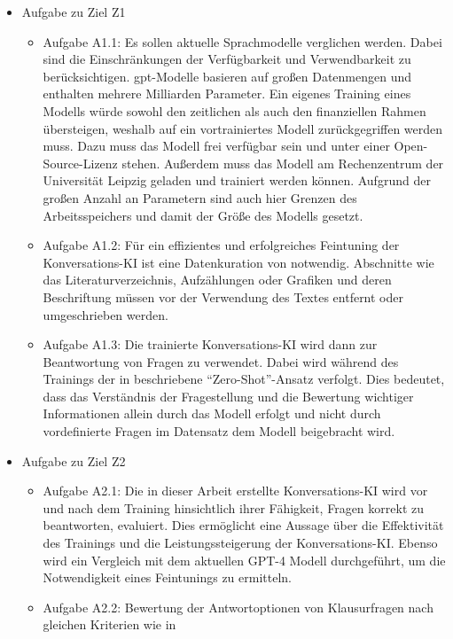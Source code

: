 \begin{itemize}
  \item Aufgabe zu Ziel Z1
  \begin{itemize}
    \item Aufgabe A1.1: Es sollen aktuelle Sprachmodelle verglichen werden. Dabei sind die Einschränkungen der Verfügbarkeit und Verwendbarkeit zu berücksichtigen. 
    \ac{gpt}-Modelle basieren auf großen Datenmengen und enthalten mehrere Milliarden Parameter. 
    Ein eigenes Training eines Modells würde sowohl den zeitlichen als auch den finanziellen Rahmen übersteigen, weshalb auf ein vortrainiertes Modell zurückgegriffen werden muss. 
    Dazu muss das Modell frei verfügbar sein und unter einer Open-Source-Lizenz stehen. Außerdem muss das Modell am Rechenzentrum der Universität Leipzig geladen und trainiert werden können. Aufgrund der großen Anzahl an Parametern sind auch hier Grenzen des Arbeitsspeichers und damit der Größe des Modells gesetzt.
    \item Aufgabe A1.2: Für ein effizientes und erfolgreiches Feintuning der Konversations-KI ist eine Datenkuration von \citet{bb} notwendig. 
    Abschnitte wie das Literaturverzeichnis, Aufzählungen oder Grafiken und deren Beschriftung müssen vor der Verwendung des Textes entfernt oder umgeschrieben werden.
    \item Aufgabe A1.3: Die trainierte Konversations-KI wird dann zur Beantwortung von Fragen zu \citet{bb} verwendet. 
    Dabei wird während des Trainings der in \citet{gpt3} beschriebene \enquote{Zero-Shot}-Ansatz verfolgt.
    Dies bedeutet, dass das Verständnis der Fragestellung und die Bewertung wichtiger Informationen allein durch das Modell erfolgt und nicht durch vordefinierte Fragen im Datensatz dem Modell beigebracht wird.
  \end{itemize}
  \item Aufgabe zu Ziel Z2
  \begin{itemize}
    \item Aufgabe A2.1: Die in dieser Arbeit erstellte Konversations-KI wird vor und nach dem Training hinsichtlich ihrer Fähigkeit, Fragen korrekt zu beantworten, evaluiert.
    Dies ermöglicht eine Aussage über die Effektivität des Trainings und die Leistungssteigerung der Konversations-KI.\@
    Ebenso wird ein Vergleich mit dem aktuellen GPT-4 Modell \citep{gpt4} durchgeführt, um die Notwendigkeit eines Feintunings zu ermitteln.
    \item Aufgabe A2.2: Bewertung der Antwortoptionen von Klausurfragen nach gleichen Kriterien wie in \citet{chatgpt_qas}
  \end{itemize}
\end{itemize}

